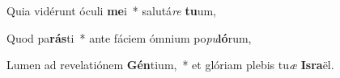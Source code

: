 \item Quia vidérunt óculi \textbf{me}i~* salutá\textit{re} \textbf{tu}um,
\item Quod pa\textbf{rás}ti~* ante fáciem ómnium po\textit{pu}\textbf{ló}rum,
\item Lumen ad revelatiónem \textbf{Gén}tium,~* et glóriam plebis tu\textit{æ} \textbf{Is}\textbf{ra}ël.
